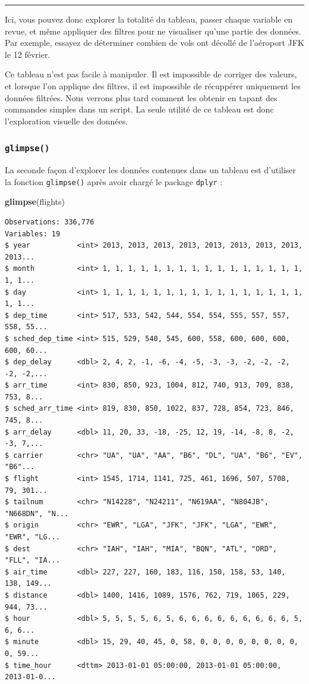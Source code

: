 \documentclass[a4paperpaper,]{article}
\newenvironment{Shaded}{\begin{snugshade}}{\end{snugshade}}
\newcommand{\KeywordTok}[1]{\textcolor[rgb]{0.13,0.29,0.53}{\textbf{#1}}}
\newcommand{\NormalTok}[1]{#1}
\theoremstyle{definition}
\theoremstyle{definition}
\theoremstyle{definition}
\theoremstyle{remark}
\begin{document}
\begin{center}\rule{0.5\linewidth}{\linethickness}\end{center}

Ici, vous pouvez donc explorer la totalité du tableau, passer chaque
variable en revue, et même appliquer des filtres pour ne visualiser
qu'une partie des données. Par exemple, essayez de déterminer combien de
vols ont décollé de l'aéroport JFK le 12 février.

Ce tableau n'est pas facile à manipuler. Il est impossible de corriger
des valeurs, et lorsque l'on applique des filtres, il est impossible de
récuppérer uniquement les données filtrées. Nous verrons plus tard
comment les obtenir en tapant des commandes simples dans un script. La
seule utilité de ce tableau est donc l'exploration visuelle des données.

\subsubsection{\texorpdfstring{\texttt{glimpse()}}{glimpse()}}\label{glimpse}

La seconde façon d'explorer les données contenues dans un tableau est
d'utiliser la fonction \texttt{glimpse()} après avoir chargé le package
\texttt{dplyr} :

\begin{Shaded}
\begin{Highlighting}[]
\KeywordTok{glimpse}\NormalTok{(flights)}
\end{Highlighting}
\end{Shaded}

\begin{verbatim}
Observations: 336,776
Variables: 19
$ year           <int> 2013, 2013, 2013, 2013, 2013, 2013, 2013, 2013, 2013...
$ month          <int> 1, 1, 1, 1, 1, 1, 1, 1, 1, 1, 1, 1, 1, 1, 1, 1, 1, 1...
$ day            <int> 1, 1, 1, 1, 1, 1, 1, 1, 1, 1, 1, 1, 1, 1, 1, 1, 1, 1...
$ dep_time       <int> 517, 533, 542, 544, 554, 554, 555, 557, 557, 558, 55...
$ sched_dep_time <int> 515, 529, 540, 545, 600, 558, 600, 600, 600, 600, 60...
$ dep_delay      <dbl> 2, 4, 2, -1, -6, -4, -5, -3, -3, -2, -2, -2, -2, -2,...
$ arr_time       <int> 830, 850, 923, 1004, 812, 740, 913, 709, 838, 753, 8...
$ sched_arr_time <int> 819, 830, 850, 1022, 837, 728, 854, 723, 846, 745, 8...
$ arr_delay      <dbl> 11, 20, 33, -18, -25, 12, 19, -14, -8, 8, -2, -3, 7,...
$ carrier        <chr> "UA", "UA", "AA", "B6", "DL", "UA", "B6", "EV", "B6"...
$ flight         <int> 1545, 1714, 1141, 725, 461, 1696, 507, 5708, 79, 301...
$ tailnum        <chr> "N14228", "N24211", "N619AA", "N804JB", "N668DN", "N...
$ origin         <chr> "EWR", "LGA", "JFK", "JFK", "LGA", "EWR", "EWR", "LG...
$ dest           <chr> "IAH", "IAH", "MIA", "BQN", "ATL", "ORD", "FLL", "IA...
$ air_time       <dbl> 227, 227, 160, 183, 116, 150, 158, 53, 140, 138, 149...
$ distance       <dbl> 1400, 1416, 1089, 1576, 762, 719, 1065, 229, 944, 73...
$ hour           <dbl> 5, 5, 5, 5, 6, 5, 6, 6, 6, 6, 6, 6, 6, 6, 6, 5, 6, 6...
$ minute         <dbl> 15, 29, 40, 45, 0, 58, 0, 0, 0, 0, 0, 0, 0, 0, 0, 59...
$ time_hour      <dttm> 2013-01-01 05:00:00, 2013-01-01 05:00:00, 2013-01-0...
\end{verbatim}
\end{document}
